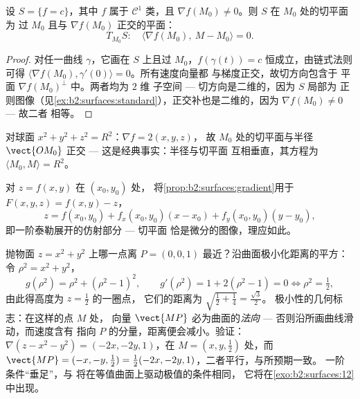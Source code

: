 \begin{proposition}[等值曲面的法向量]\label{prop:b2:surfaces:gradient}
设 $S = \{f = c\}$，其中 $f$ 属于 $\mathcal{C}^1$ 类，且 $\nabla
f(M_0) \neq 0$。则 $S$ 在 $M_0$ 处的切平面为
过 $M_0$ 且与 $\nabla f(M_0)$ 正交的平面：
\[
T_{M_0}S :\quad
\langle \nabla f(M_0),\ M - M_0\rangle = 0 .
\]
\end{proposition}

\begin{proof}
对任一曲线 $\gamma$，它画在 $S$ 上且过 $M_0$，$f(\gamma(t)) =
c$ 恒成立，由链式法则可得 $\langle
\nabla f(M_0), \gamma'(0)\rangle = 0$。所有速度向量都
与梯度正交，故切方向包含于
平面 $\nabla f(M_0)^\perp$ 中。两者均为 $2$ 维
子空间 --- 切方向是二维的，因为 $S$ 局部为
正则图像（见\cref{ex:b2:surfaces:standard}），正交补也是二维的，因为
$\nabla f(M_0) \neq 0$ --- 故二者
相等。
\end{proof}

\begin{example}\label{ex:b2:surfaces:spheretangent}
对球面 $x^2 + y^2 + z^2 = R^2$：$\nabla f = 2(x, y, z)$，
故 $M_0$ 处的切平面与半径
$\vect{OM_0}$ 正交 --- 这是经典事实：半径与切平面
互相垂直，其方程为 $\langle M_0, M\rangle = R^2$。
\end{example}

\begin{example}[图像的切平面]\label{ex:b2:surfaces:graphtangent}
对 $z = f(x, y)$ 在 $(x_0, y_0)$ 处，
将\cref{prop:b2:surfaces:gradient}用于 $F(x,y,z) = f(x,y) - z$，
\[
z = f(x_0, y_0)
+ f_x(x_0, y_0)(x - x_0)
+ f_y(x_0, y_0)(y - y_0) ,
\]
即一阶泰勒展开的仿射部分 --- 切平面
恰是微分的图像，理应如此。
\end{example}

\begin{example}\label{ex:b2:surfaces:closest}
抛物面 $z = x^2 + y^2$ 上哪一点离
$P = (0, 0, 1)$ 最近？沿曲面极小化距离的平方：
令 $\rho^2 = x^2 + y^2$，
\[
g(\rho^2) = \rho^2 + (\rho^2 - 1)^2,
\qquad
g'(\rho^2) = 1 + 2(\rho^2 - 1) = 0
\iff \rho^2 = \tfrac12 ,
\]
由此得高度为 $z = \frac12$ 的一圈点，
它们的距离为 $\sqrt{\tfrac12 + \tfrac14} = \frac{\sqrt3}2$。
极小性的几何标志：在这样的点 $M$ 处，
向量 $\vect{MP}$ 必为曲面的\emph{法向} ---
否则沿所画曲线滑动，而速度含有
指向 $P$ 的分量，距离便会减小。验证：
$\nabla(z - x^2 - y^2) = (-2x, -2y, 1)$，在 $M = (x, y,
\tfrac12)$ 处，而 $\vect{MP} = (-x, -y, \tfrac12) =
\tfrac12(-2x, -2y, 1)$，二者平行，与所预期一致。
一阶条件“垂足”，与
将在等值曲面上驱动极值的条件相同，
它将在\cref{exo:b2:surfaces:12}中出现。
\end{example}

